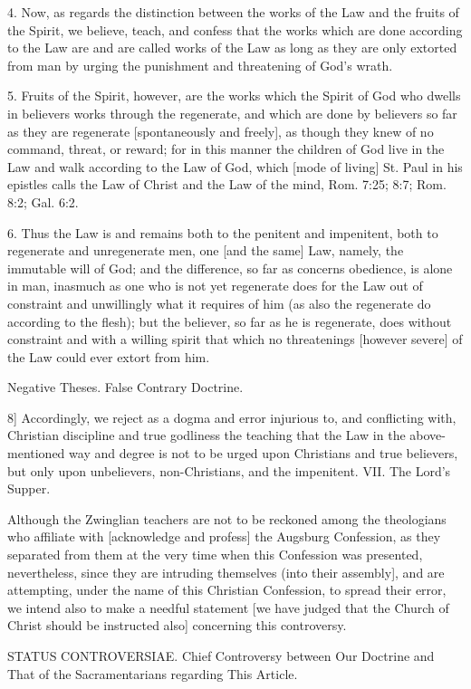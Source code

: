 4. Now, as regards the distinction between the works of the Law and the fruits of the Spirit, we believe, teach, and confess that the works which are done according to the Law are and are called works of the Law as long as they are only extorted from man by urging the punishment and threatening of God's wrath.

5. Fruits of the Spirit, however, are the works which the Spirit of God who dwells in believers works through the regenerate, and which are done by believers so far as they are regenerate [spontaneously and freely], as though they knew of no command, threat, or reward; for in this manner the children of God live in the Law and walk according to the Law of God, which [mode of living] St. Paul in his epistles calls the Law of Christ and the Law of the mind, Rom. 7:25; 8:7; Rom. 8:2; Gal. 6:2.

6. Thus the Law is and remains both to the penitent and impenitent, both to regenerate and unregenerate men, one [and the same] Law, namely, the immutable will of God; and the difference, so far as concerns obedience, is alone in man, inasmuch as one who is not yet regenerate does for the Law out of constraint and unwillingly what it requires of him (as also the regenerate do according to the flesh); but the believer, so far as he is regenerate, does without constraint and with a willing spirit that which no threatenings [however severe] of the Law could ever extort from him.

Negative Theses.
False Contrary Doctrine.

8] Accordingly, we reject as a dogma and error injurious to, and conflicting with, Christian discipline and true godliness the teaching that the Law in the above-mentioned way and degree is not to be urged upon Christians and true believers, but only upon unbelievers, non-Christians, and the impenitent.
VII. The Lord's Supper.

Although the Zwinglian teachers are not to be reckoned among the theologians who affiliate with [acknowledge and profess] the Augsburg Confession, as they separated from them at the very time when this Confession was presented, nevertheless, since they are intruding themselves (into their assembly], and are attempting, under the name of this Christian Confession, to spread their error, we intend also to make a needful statement [we have judged that the Church of Christ should be instructed also] concerning this controversy.

STATUS CONTROVERSIAE.
Chief Controversy between Our Doctrine and That of the Sacramentarians regarding This Article.

